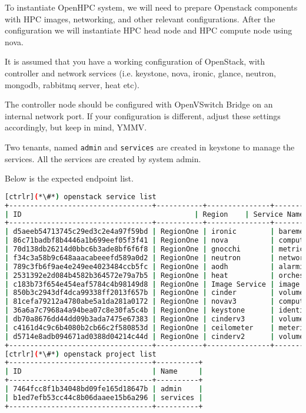 	To instantiate OpenHPC system, we will need to prepare Openstack components with HPC images, networking, and other relevant configurations. After the configuration we will instantiate HPC head node and HPC compute node using nova. 

	It is assumed that you have a working configuration of OpenStack, with controller and network services (i.e. keystone, nova, ironic, glance, neutron, mongodb, rabbitmq server, heat etc). 

	The controller node should be configured with OpenVSwitch Bridge on an internal network port. If your configuration is different, adjust these settings accordingly, but keep in mind, YMMV.

	Two tenants, named \texttt{admin} and \texttt{services} are created in keystone to manage the services. All the services are created by system admin. 

	Below is the expected endpoint list.



\begin{lstlisting}[language=bash,keywords={}]
[ctrlr](*\#*) openstack service list
+----------------------------------+-----------+---------------+---------------+
| ID                                         | Region    | Service Name  | Service Type  |
+----------------------------------+-----------+---------------+---------------+
| d5aeeb54713745c29ed3c2e4a97f59bd | RegionOne | ironic        | baremetal     |
| 86c71badbf8b4446a1b699eef05f3f41 | RegionOne | nova          | compute       |
| 70d138db26214d0bbc6b3ade8bf6f6f8 | RegionOne | gnocchi       | metric        |
| f34c3a58b9c648aaacabeeefd589a0d2 | RegionOne | neutron       | network       |
| 789c3fb6f9ae4e249ee4023484ccb5fc | RegionOne | aodh          | alarming      |
| 2531392e2d084b4582b364572e79a7b5 | RegionOne | heat          | orchestration |
| c183b73f654e454eaf5784c4b98149d8 | RegionOne | Image Service | image         |
| 850b3c2943df4dca99338ff2013f657b | RegionOne | cinder        | volume        |
| 81cefa79212a4780abe5a1da281a0172 | RegionOne | novav3        | computev3     |
| 36a6a7c7968a4a94bea07c8e30fa5c4b | RegionOne | keystone      | identity      |
| db70a8676dd44dd09b3ada7475e67383 | RegionOne | cinderv3      | volumev3      |
| c4161d4c9c6b4080b2cb66c2f580853d | RegionOne | ceilometer    | metering      |
| d5714e8adb094671ad0388d04214c44d | RegionOne | cinderv2      | volumev2      |
+----------------------------------+-----------+---------------+---------------+
[ctrlr](*\#*) openstack project list
+----------------------------------+----------+
| ID                               | Name     |
+----------------------------------+----------+
| 7464fcc8f1b34048bd09fe165d18647b | admin    |
| b1ed7efb53cc44c8b06daaee15b6a296 | services |
+----------------------------------+----------+
\end{lstlisting}


